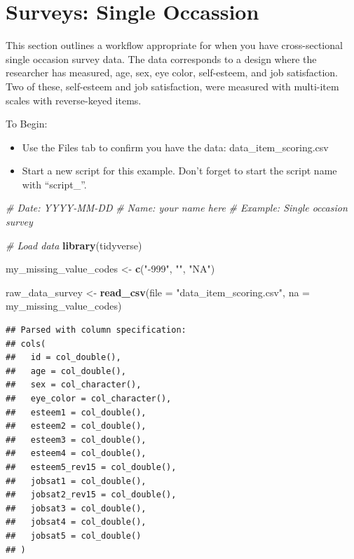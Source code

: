 \documentclass[
]{krantz}
\makeatletter
\newenvironment{Shaded}{\begin{snugshade}}{\end{snugshade}}
\newcommand{\CommentTok}[1]{\textcolor[rgb]{0.37,0.37,0.37}{\textit{#1}}}
\newcommand{\DataTypeTok}[1]{\textcolor[rgb]{0.27,0.27,0.27}{#1}}
\newcommand{\KeywordTok}[1]{\textcolor[rgb]{0.27,0.27,0.27}{\textbf{#1}}}
\newcommand{\NormalTok}[1]{#1}
\newcommand{\StringTok}[1]{\textcolor[rgb]{0.5,0.5,0.5}{#1}}
\newenvironment{kframe}{%
\medskip{}
\setlength{\fboxsep}{.8em}
 \def\at@end@of@kframe{}%
 \ifinner\ifhmode%
  \def\at@end@of@kframe{\end{minipage}}%
  \begin{minipage}{\columnwidth}%
 \fi\fi%
 \def\FrameCommand##1{\hskip\@totalleftmargin \hskip-\fboxsep
 \colorbox{shadecolor}{##1}\hskip-\fboxsep
     \hskip-\linewidth \hskip-\@totalleftmargin \hskip\columnwidth}%
 \MakeFramed {\advance\hsize-\width
   \@totalleftmargin\z@ \linewidth\hsize
   \@setminipage}}%
 {\par\unskip\endMakeFramed%
 \at@end@of@kframe}
\renewenvironment{Shaded}{\begin{kframe}}{\end{kframe}}
\makeatother
\begin{document}
\hypertarget{surveys-single-occassion}{%
\section{Surveys: Single Occassion}\label{surveys-single-occassion}}

This section outlines a workflow appropriate for when you have cross-sectional single occasion survey data. The data corresponds to a design where the researcher has measured, age, sex, eye color, self-esteem, and job satisfaction. Two of these, self-esteem and job satisfaction, were measured with multi-item scales with reverse-keyed items.

To Begin:

\begin{itemize}
\item
  Use the Files tab to confirm you have the data: data\_item\_scoring.csv
\item
  Start a new script for this example. Don't forget to start the script name with ``script\_''.
\end{itemize}

\begin{Shaded}
\begin{Highlighting}[]
\CommentTok{# Date: YYYY-MM-DD}
\CommentTok{# Name: your name here}
\CommentTok{# Example: Single occasion survey}

\CommentTok{# Load data}
\KeywordTok{library}\NormalTok{(tidyverse)}

\NormalTok{my_missing_value_codes <-}\StringTok{ }\KeywordTok{c}\NormalTok{(}\StringTok{"-999"}\NormalTok{, }\StringTok{""}\NormalTok{, }\StringTok{"NA"}\NormalTok{)}

\NormalTok{raw_data_survey <-}\StringTok{ }\KeywordTok{read_csv}\NormalTok{(}\DataTypeTok{file =} \StringTok{"data_item_scoring.csv"}\NormalTok{,}
                     \DataTypeTok{na =}\NormalTok{ my_missing_value_codes)}
\end{Highlighting}
\end{Shaded}

\begin{verbatim}
## Parsed with column specification:
## cols(
##   id = col_double(),
##   age = col_double(),
##   sex = col_character(),
##   eye_color = col_character(),
##   esteem1 = col_double(),
##   esteem2 = col_double(),
##   esteem3 = col_double(),
##   esteem4 = col_double(),
##   esteem5_rev15 = col_double(),
##   jobsat1 = col_double(),
##   jobsat2_rev15 = col_double(),
##   jobsat3 = col_double(),
##   jobsat4 = col_double(),
##   jobsat5 = col_double()
## )
\end{verbatim}
\end{document}
